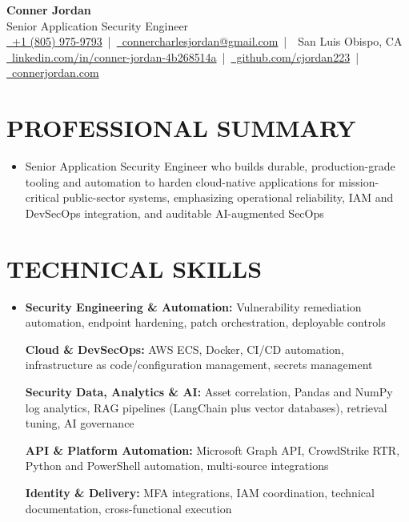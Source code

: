 \documentclass[letterpaper,10pt]{article}
\newcommand{\resumeSubHeadingListStart}{\begin{itemize}[leftmargin=0in,label={}]}
\newcommand{\resumeSubHeadingListEnd}{\end{itemize}}
\begin{document}
\begin{center}
  {\Huge \textbf{Conner Jordan}}\\[0pt]
  {\Large Senior Application Security Engineer}\\[0pt]
  \href{tel:+18059759793}{\faPhone\ +1 (805) 975-9793} \,|\, 
  \href{mailto:connercharlesjordan@gmail.com}{\faEnvelope\ connercharlesjordan@gmail.com} \,|\, 
  \faMapMarker\ San Luis Obispo, CA \\[-2pt]
  \href{https://www.linkedin.com/in/conner-jordan-4b268514a/}{\faLinkedin\ linkedin.com/in/conner-jordan-4b268514a}
  \,|\, \href{https://github.com/cjordan223}{\faGithub\ github.com/cjordan223}
  \,|\, \href{https://connerjordan.com/}{\faGlobe\ connerjordan.com}
\end{center}

\vspace{4pt}

\section{PROFESSIONAL SUMMARY}
\vspace{8pt}
\resumeSubHeadingListStart
\item {\small
Senior Application Security Engineer who builds durable, production-grade tooling and automation to harden cloud-native applications for mission-critical public-sector systems, emphasizing operational reliability, IAM and DevSecOps integration, and auditable AI-augmented SecOps}
\resumeSubHeadingListEnd
\vspace{6pt}

\section{TECHNICAL SKILLS}
\vspace{6pt}
\resumeSubHeadingListStart
\item {\small
\textbf{Security Engineering \& Automation:} Vulnerability remediation automation, endpoint hardening, patch orchestration, deployable controls

\vspace{3pt}
\textbf{Cloud \& DevSecOps:} AWS ECS, Docker, CI/CD automation, infrastructure as code/configuration management, secrets management

\vspace{3pt}
\textbf{Security Data, Analytics \& AI:} Asset correlation, Pandas and NumPy log analytics, RAG pipelines (LangChain plus vector databases), retrieval tuning, AI governance

\vspace{3pt}
\textbf{API \& Platform Automation:} Microsoft Graph API, CrowdStrike RTR, Python and PowerShell automation, multi-source integrations

\vspace{3pt}
\textbf{Identity \& Delivery:} MFA integrations, IAM coordination, technical documentation, cross-functional execution
}
\resumeSubHeadingListEnd
\vspace{6pt}
\end{document}
